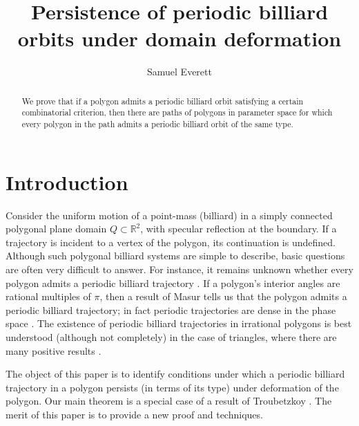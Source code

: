 \documentclass[12pt]{amsart}
\theoremstyle{theorem}
\theoremstyle{remark}
\numberwithin{equation}{section}
\newcommand{\RR}{\mathbb{R}}
\begin{document}
\title[Cycling projections and periodic billiard orbits]{Persistence of periodic billiard orbits under domain deformation} 
\author{Samuel Everett}
\address{University of Chicago}

\maketitle

\begin{abstract}
We prove that if a polygon admits a periodic billiard orbit satisfying a certain combinatorial criterion, then there are paths of polygons in parameter space for which every polygon in the path admits a periodic billiard orbit of the same type.
\end{abstract}

\tableofcontents

\section{Introduction}

Consider the uniform motion of a point-mass (billiard) in a simply connected polygonal plane domain $Q\subset \RR^2$, with specular reflection at the boundary. If a trajectory is incident to a vertex of the polygon, its continuation is undefined.
Although such polygonal billiard systems are simple to describe, basic questions are often very difficult to answer.
For instance, it remains unknown whether every polygon admits a periodic billiard trajectory \cite{gutkin2012billiard,schwartz2021survey}.
If a polygon's interior angles are rational multiples of $\pi$, then a result of Masur \cite{masur1986closed} tells us that the polygon admits a periodic billiard trajectory; in fact periodic trajectories are dense in the phase space \cite{boshernitzan1998periodic}. The existence of periodic billiard trajectories in irrational polygons is  best understood (although not completely) in the case of triangles, where there are many positive results \cite{holt1993periodic,gal2003periodic,hooper2007periodic,troubetzkoy2005periodic,schwartz2006obtuse,schwartz2009obtuse,halbeisen2000periodic,vorobets1992periodic}.

The object of this paper is to identify conditions under which a periodic billiard trajectory in a polygon persists (in terms of its type) under deformation of the polygon. Our main theorem is a special case of a result of Troubetzkoy \cite{troub2004recurrence}. The merit of this paper is to provide a new proof and techniques.
\end{document}
